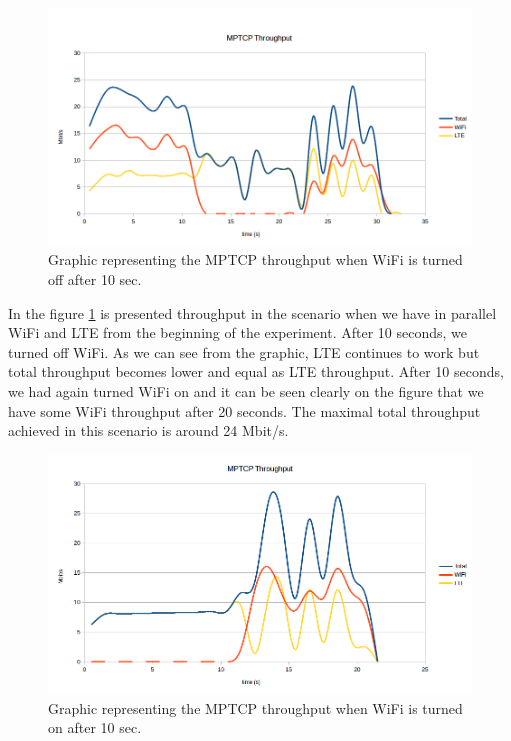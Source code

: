 \documentclass{llncs}
\begin{document}
\begin{figure}[H]
\centering
\includegraphics[width=1.0\textwidth]{result1.png}
\caption{\label{fig:r1} Graphic representing the MPTCP throughput when WiFi is turned off after 10 sec.}
\end{figure}

In the figure \ref{fig:r1} is presented throughput in the scenario when we have in parallel WiFi and LTE from the beginning of the experiment. After 10 seconds, we turned off WiFi. As we can see from the graphic, LTE continues to work but total throughput becomes lower and equal as LTE throughput. After 10 seconds, we had again turned WiFi on and it can be seen clearly on the figure that we have some WiFi throughput after 20 seconds. The maximal total throughput achieved in this scenario is around 24 Mbit/s.

\begin{figure}[H]
\centering
\includegraphics[width=1.0\textwidth]{result2.png}
\caption{\label{fig:r2} Graphic representing the MPTCP throughput when WiFi is turned on after 10 sec.}
\end{figure}
\end{document}
